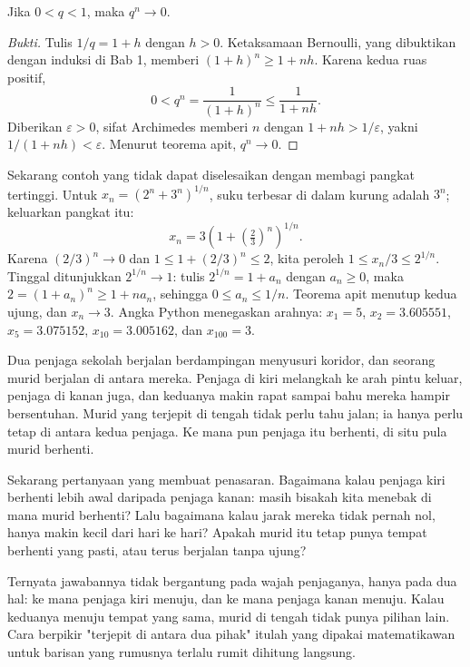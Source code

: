 \begin{lemma}
Jika $0<q<1$, maka $q^n \to 0$.
\end{lemma}

\begin{proof}[Bukti]
Tulis $1/q=1+h$ dengan $h>0$. Ketaksamaan Bernoulli, yang dibuktikan dengan induksi
di Bab 1, memberi $(1+h)^n \ge 1+nh$. Karena kedua ruas positif,
\[
0 < q^n = \frac{1}{(1+h)^n} \le \frac{1}{1+nh} .
\]
Diberikan $\varepsilon>0$, sifat Archimedes memberi $n$ dengan $1+nh>1/\varepsilon$,
yakni $1/(1+nh)<\varepsilon$. Menurut teorema apit, $q^n \to 0$.
\end{proof}

Sekarang contoh yang tidak dapat diselesaikan dengan membagi pangkat tertinggi.
Untuk $x_n=(2^n+3^n)^{1/n}$, suku terbesar di dalam kurung adalah $3^n$; keluarkan
pangkat itu:
\[
x_n = 3\left(1+\left(\tfrac{2}{3}\right)^{n}\right)^{1/n}.
\]
Karena $(2/3)^n \to 0$ dan $1 \le 1+(2/3)^n \le 2$, kita peroleh
$1 \le x_n/3 \le 2^{1/n}$. Tinggal ditunjukkan $2^{1/n} \to 1$: tulis
$2^{1/n}=1+a_n$ dengan $a_n \ge 0$, maka
$2=(1+a_n)^n \ge 1+na_n$, sehingga $0 \le a_n \le 1/n$. Teorema apit menutup
kedua ujung, dan $x_n \to 3$. Angka Python menegaskan arahnya:
$x_1=5$, $x_2=3.605551$, $x_5=3.075152$, $x_{10}=3.005162$, dan $x_{100}=3$.

\begin{untukanak}
Dua penjaga sekolah berjalan berdampingan menyusuri koridor, dan seorang murid
berjalan di antara mereka. Penjaga di kiri melangkah ke arah pintu keluar, penjaga
di kanan juga, dan keduanya makin rapat sampai bahu mereka hampir bersentuhan.
Murid yang terjepit di tengah tidak perlu tahu jalan; ia hanya perlu tetap di
antara kedua penjaga. Ke mana pun penjaga itu berhenti, di situ pula murid
berhenti.

Sekarang pertanyaan yang membuat penasaran. Bagaimana kalau penjaga kiri berhenti
lebih awal daripada penjaga kanan: masih bisakah kita menebak di mana murid
berhenti? Lalu bagaimana kalau jarak mereka tidak pernah nol, hanya makin kecil
dari hari ke hari? Apakah murid itu tetap punya tempat berhenti yang pasti, atau
terus berjalan tanpa ujung?

Ternyata jawabannya tidak bergantung pada wajah penjaganya, hanya pada dua hal: ke
mana penjaga kiri menuju, dan ke mana penjaga kanan menuju. Kalau keduanya menuju
tempat yang sama, murid di tengah tidak punya pilihan lain. Cara berpikir "terjepit
di antara dua pihak" itulah yang dipakai matematikawan untuk barisan yang rumusnya
terlalu rumit dihitung langsung.
\end{untukanak}

